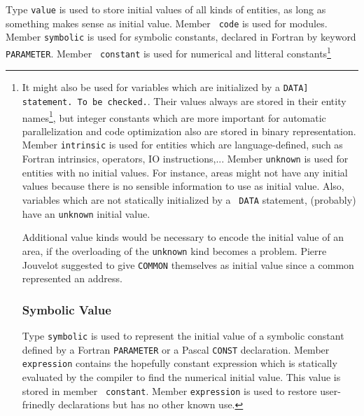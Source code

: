 Type {\tt value} is used to store initial values of all kinds of
entities, as long as something makes sense as initial value. Member {\tt
code} is used for modules. Member {\tt symbolic} is used for symbolic
constants, declared in Fortran by keyword {\tt PARAMETER}. Member {\tt
constant} is used for numerical and litteral constants\footnote{It might
also be used for variables which are initialized by a {\tt DATA]
statement. To be checked.}. Their values always are stored in their
entity names\footnote{Their local name is the external representation of
their value as defined by the language.}, but integer constants which
are more important for automatic parallelization and code optimization
also are stored in binary representation. Member {\tt intrinsic} is used
for entities which are language-defined, such as Fortran intrinsics,
operators, IO instructions,... Member {\tt unknown} is used for entities
with no initial values. For instance, areas might not have any initial
values because there is no sensible information to use as initial
value. Also, variables which are not statically initialized by a {\tt
DATA} statement, (probably) have an {\tt unknown} initial value.

\iffalse
Le domaine \verb/value/ permet de repre'senter les
valeurs initiales des entite's. Le sous-domaine \verb/code/ est utilise'
pour les entite's modules. Le sous-domaine \verb/symbolic/ est utilise'
pour les entite's constantes symboliques. Le sous-domaine
\verb/constant/ est utilise' pour les entite's constantes. Le
sous-domaine \verb/intrinsic/ est utilise' pour toutes les entite's qui
ne de'pendent que du langage, telles que les intrinsics Fortran, les
ope'rateurs, les instructions, etc. Enfin le sous-domaine
\verb/unknown/ est utilise' pour les valeurs initiales inconnues.
\fi

Additional value kinds would be necessary to encode the initial value of
an area, if the overloading of the \verb+unknown+ kind becomes a
problem. Pierre Jouvelot suggested to give \verb+COMMON+ themselves as
initial value since a common represented an address.

\subsubsection{Symbolic Value}
\label{subsubsection-symbolic}

{}
Type {\tt symbolic} is used to represent the initial value of a symbolic
constant defined by a Fortran {\tt PARAMETER} or a Pascal {\tt CONST}
declaration. Member {\tt expression} contains the hopefully constant
expression which is statically evaluated by the compiler to find the
numerical initial value. This value is stored in member {\tt
constant}. Member {\tt expression} is used to restore user-frinedly
declarations but has no other known use. 

}
